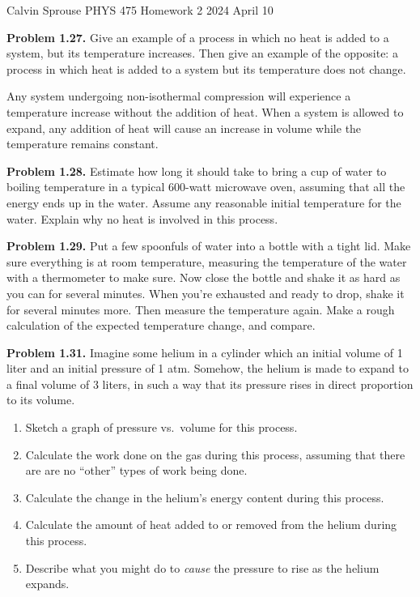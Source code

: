\documentclass[a4paper, 12pt]{config/homework}
\begin{document}
\noindent
\hfill Calvin Sprouse \hfill PHYS 475 Homework 2 \hfill 2024 April 10 \hfill
\bigskip

\bigskip\noindent \textbf{Problem 1.27.}
Give an example of a process in which no heat is added to a system, but its temperature increases. Then give an example of the opposite: a process in which heat is added to a system but its temperature does not change.

\bigskip\noindent
Any system undergoing non-isothermal compression will experience a temperature increase without the addition of heat. When a system is allowed to expand, any addition of heat will cause an increase in volume while the temperature remains constant.

\bigskip\noindent \textbf{Problem 1.28.}
Estimate how long it should take to bring a cup of water to boiling temperature in a typical 600-watt microwave oven, assuming that all the energy ends up in the water. Assume any reasonable initial temperature for the water. Explain why no heat is involved in this process.

\bigskip\noindent


\bigskip\noindent \textbf{Problem 1.29.} Put a few spoonfuls of water into a bottle with a tight lid. Make sure everything is at room temperature, measuring the temperature of the water with a thermometer to make sure. Now close the bottle and shake it as hard as you can for several minutes. When you're exhausted and ready to drop, shake it for several minutes more. Then measure the temperature again. Make a rough calculation of the expected temperature change, and compare.

\bigskip\noindent


\bigskip\noindent \textbf{Problem 1.31.} Imagine some helium in a cylinder which an initial volume of 1 liter and an initial pressure of 1 atm. Somehow, the helium is made to expand to a final volume of 3 liters, in such a way that its pressure rises in direct proportion to its volume.
\begin{enumerate}[label=\textbf{(\alph*)}]
\item Sketch a graph of pressure vs.\ volume for this process.
\item Calculate the work done on the gas during this process, assuming that there are are no ``other'' types of work being done.
\item Calculate the change in the helium's energy content during this process.
\item Calculate the amount of heat added to or removed from the helium during this process.
\item Describe what you might do to \textit{cause} the pressure to rise as the helium expands.
\end{enumerate}
\end{document}
